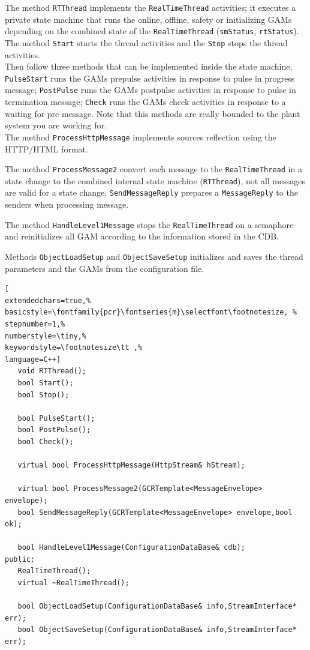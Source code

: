 The method \texttt{RTThread} implements the \texttt{RealTimeThread} activities; it executes a private state machine that runs the online, offline, safety or initializing GAMs depending on the combined state of the \texttt{RealTimeThread} (\texttt{smStatus}, \texttt{rtStatus}). The method \texttt{Start} starts the thread activities and the \texttt{Stop} stops the thread activities. \\


Then follow three methods that can be implemented inside the state machine, \texttt{PulseStart} runs the GAMs prepulse activities in response to pulse in progress message; \texttt{PostPulse} runs the GAMs postpulse activities in response to pulse in termination message; \texttt{Check} runs the GAMs check activities in response to a waiting for pre message. Note that this methods are really bounded to the plant system you are working for. \\

The method \texttt{ProcessHttpMessage} implements sources reflection using the HTTP/HTML format.

The method \texttt{ProcessMessage2} convert each message to the \texttt{RealTimeThread} in a state change to the combined internal state machine (\texttt{RTThread}), not all messages are valid for a state change. \texttt{SendMessageReply} prepares a \texttt{MessageReply} to the senders when processing message.

The method \texttt{HandleLevel1Message} stops the \texttt{RealTimeThread} on a semaphore and reinitializes all GAM according to the information stored in the CDB.

Methods \texttt{ObjectLoadSetup} and \texttt{ObjectSaveSetup} initializes and saves the thread parameters and the GAMs from the configuration file.

\begin{lstlisting}[
extendedchars=true,%
basicstyle=\fontfamily{pcr}\fontseries{m}\selectfont\footnotesize, %
stepnumber=1,%
numberstyle=\tiny,%
keywordstyle=\footnotesize\tt ,%
language=C++]
   void RTThread();
   bool Start();
   bool Stop();

   bool PulseStart();
   bool PostPulse();
   bool Check();

   virtual bool ProcessHttpMessage(HttpStream& hStream);

   virtual bool ProcessMessage2(GCRTemplate<MessageEnvelope> envelope);
   bool SendMessageReply(GCRTemplate<MessageEnvelope> envelope,bool ok);

   bool HandleLevel1Message(ConfigurationDataBase& cdb);
public:
   RealTimeThread();
   virtual ~RealTimeThread();

   bool ObjectLoadSetup(ConfigurationDataBase& info,StreamInterface* err);
   bool ObjectSaveSetup(ConfigurationDataBase& info,StreamInterface* err);
\end{lstlisting}



